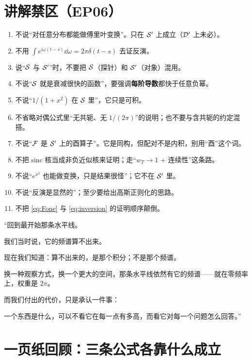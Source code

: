 \section{讲解禁区（EP06）}

\begin{warnbox}[逐条对照]
\begin{enumerate}[leftmargin=1.6em,itemsep=0.28em]
\item 不说“对任意分布都能做傅里叶变换”。只在 $\mathcal{S}'$ 上成立（$\mathcal{D}'$ 上未必）。
\item 不用 $\int e^{i\omega(t-s)}\dd\omega=2\pi\delta(t-s)$ 去证反演。
\item 说“$\mathcal{S}$ 与 $\mathcal{S}'$”时，不要把 $\mathcal{S}$（探针）和 $\mathcal{S}'$（对象）混用。
\item 不说“$\mathcal{S}$ 就是衰减很快的函数”，要强调\textbf{每阶导数}都快于任意负幂。
\item 不说“$1/(1+x^{2})$ 在 $\mathcal{S}$ 里”，它只是可积。
\item 不省略对偶公式里“无共轭、无 $1/(2\pi)$”的说明；也不要与含共轭的约定混搭。
\item 不说“$\mathcal{F}$ 是 $\mathcal{S}'$ 上的酉算子”。它是同构，但配对不是内积，别用“酉”这个词。
\item 不把 sinc 核当成非负近似核来证明；走“$w_T\to1$ + 连续性”这条路。
\item 不说“$e^{x^{2}}$ 也能做变换，只是结果很怪”；它不在 $\mathcal{S}'$ 里。
\item 不说“反演是显然的”；至少要给出高斯正则化的思路。
\item 不把 \eqref{eq:Fone} 与 \eqref{eq:inversion} 的证明顺序颠倒。
\end{enumerate}
\end{warnbox}

\begin{scriptbox}[最后 40 秒的旁白骨架]
“回到最开始那条水平线。

我们当时说，它的频谱算不出来。

现在我们知道：算不出来的，是那个积分；不是那个频谱。

换一种观察方式，换一个更大的空间，那条水平线依然有它的频谱——就在零频率上，权重是 $2\pi$。

而我们付出的代价，只是承认一件事：

一个东西是什么，可以不看它在每一点有多高，而看它对每一个问题怎么回答。”
\end{scriptbox}

\section{一页纸回顾：三条公式各靠什么成立}

